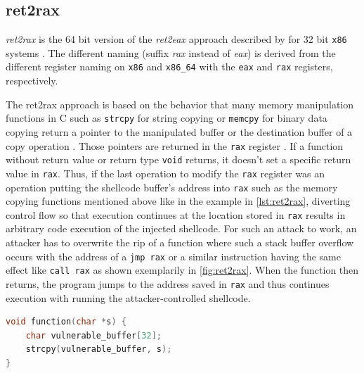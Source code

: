 \subsection{ret2rax}
\label{subsec:aici-ret2rax}

\emph{ret2rax} is the 64 bit version of the \emph{ret2eax} approach described by \citeauthor{Kotler2005} for 32 bit \texttt{x86} systems \cite{Kotler2005}.
The different naming (suffix \emph{rax} instead of \emph{eax}) is derived from the different register naming on \texttt{x86} and \texttt{x86\_64} with the \texttt{eax} and \texttt{rax} registers, respectively.

The ret2rax approach is based on the behavior that many memory manipulation functions in C such as \texttt{strcpy} for string copying or \texttt{memcpy} for binary data copying return a pointer to the manipulated buffer or the destination buffer of a copy operation \cite{Kerrisk2020b,Kerrisk2020c}.
Those pointers are returned in the \texttt{rax} register \cites[24\psq]{Lu2018}[cf.][14]{Lu2015}.
If a function without return value or return type \texttt{void} returns, it doesn't set a specific return value in \texttt{rax}.
Thus, if the last operation to modify the \texttt{rax} register was an operation putting the shellcode buffer's address into \texttt{rax} such as the memory copying functions mentioned above like in the example in \cref{lst:ret2rax}, diverting control flow so that execution continues at the location stored in \texttt{rax} results in arbitrary code execution of the injected shellcode.
For such an attack to work, an attacker has to overwrite the \gls{rip} of a function where such a stack buffer overflow occurs with the address of a \texttt{jmp rax} or a similar instruction having the same effect like \texttt{call rax} as shown exemplarily in \cref{fig:ret2rax}.
When the function then returns, the program jumps to the address saved in \texttt{rax} and thus continues execution with running the attacker-controlled shellcode.

\begin{lstlisting}[language=C,float=ht,caption={C function with stack buffer overflow vulnerability prone to ret2rax attacks}, label={lst:ret2rax}]
void function(char *s) {
    char vulnerable_buffer[32];
    strcpy(vulnerable_buffer, s);
}
\end{lstlisting}

